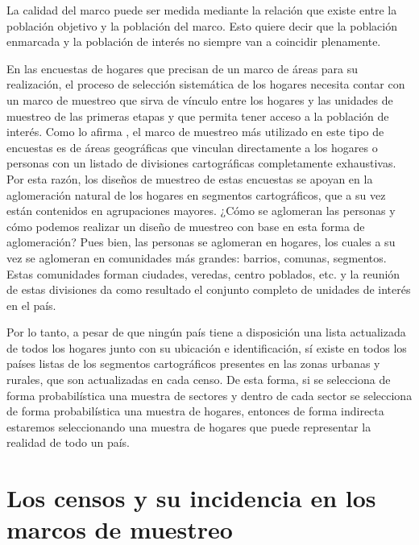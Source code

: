 \documentclass[
  10pt,
  spanish,
]{book}
\begin{document}
La calidad del marco puede ser medida mediante la relación que existe entre la población objetivo y la población del marco. Esto quiere decir que la población enmarcada y la población de interés no siempre van a coincidir plenamente.

En las encuestas de hogares que precisan de un marco de áreas para su realización, el proceso de selección sistemática de los hogares necesita contar con un marco de muestreo que sirva de vínculo entre los hogares y las unidades de muestreo de las primeras etapas y que permita tener acceso a la población de interés. Como lo afirma \citet{Gutierrez_2016}, el marco de muestreo más utilizado en este tipo de encuestas es de áreas geográficas que vinculan directamente a los hogares o personas con un listado de divisiones cartográficas completamente exhaustivas. Por esta razón, los diseños de muestreo de estas encuestas se apoyan en la aglomeración natural de los hogares en segmentos cartográficos, que a su vez están contenidos en agrupaciones mayores. ¿Cómo se aglomeran las personas y cómo podemos realizar un diseño de muestreo con base en esta forma de aglomeración? Pues bien, las personas se aglomeran en hogares, los cuales a su vez se aglomeran en comunidades más grandes: barrios, comunas, segmentos. Estas comunidades forman ciudades, veredas, centro poblados, etc. y la reunión de estas divisiones da como resultado el conjunto completo de unidades de interés en el país.

Por lo tanto, a pesar de que ningún país tiene a disposición una lista actualizada de todos los hogares junto con su ubicación e identificación, sí existe en todos los países listas de los segmentos cartográficos presentes en las zonas urbanas y rurales, que son actualizadas en cada censo. De esta forma, si se selecciona de forma probabilística una muestra de sectores y dentro de cada sector se selecciona de forma probabilística una muestra de hogares, entonces de forma indirecta estaremos seleccionando una muestra de hogares que puede representar la realidad de todo un país.

\hypertarget{los-censos-y-su-incidencia-en-los-marcos-de-muestreo}{%
\section{Los censos y su incidencia en los marcos de muestreo}\label{los-censos-y-su-incidencia-en-los-marcos-de-muestreo}}
\end{document}
